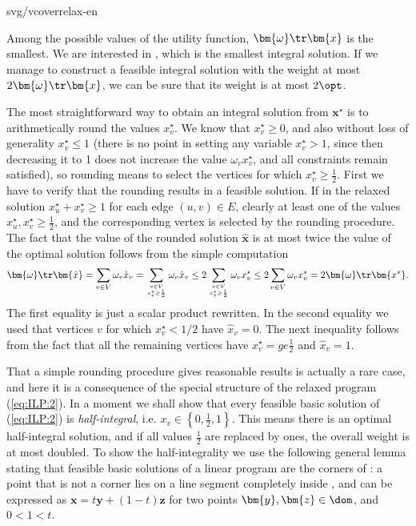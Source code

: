 \begin{myfig}{0.7\textwidth}{svg/vcoverrelax-en}
\end{myfig}

\noindent 
Among the possible values of the utility function,  $\bm{\omega}\tr\bm{x}$ is the smallest. 
We are interested in \opt, which is the smallest integral solution. If we manage to construct a
feasible integral solution with the weight at most $2\bm{\omega}\tr\bm{x}$, we can be sure that
its weight is at most $2\opt$. 


\noindent 
The most straightforward way to obtain an integral solution from $\bm{x^\star}$
is to arithmetically round the values $x_v^\star$.
We know that $x_v^\star\ge0$, and also without loss of generality $x_v^\star\le 1$ (there is no point in
setting  any variable $x_v^\star>1$, since then decreasing it to 1 does not increase the value  $\omega_vx_v^\star$,
and all constraints remain satisfied), so rounding means to select the vertices for which $x_v^\star\ge\frac{1}{2}$.
First we have to verify that the rounding results in a feasible solution. If in the relaxed solution 
$x_u^\star+x_v^\star\ge1$
for each edge $(u,v)\in E$, clearly at least one of the values $x_u^\star,x_v^\star\ge\frac{1}{2}$, 
and the corresponding vertex is selected by the
rounding procedure. The fact that the value of the rounded solution $\bm{\hat{x}}$ 
is at most twice the value of the optimal solution follows from the simple computation 
$$\bm{\omega}\tr\bm{\hat{x}}=\sum_{v\in V}\omega_v\hat{x}_v=\sum_{v\in V\atop
x_v^\star\ge\frac{1}{2}}\omega_v\hat{x}_v \le2\sum_{v\in V\atop
x_v^\star\ge\frac{1}{2}}\omega_v x_v^\star\le2\sum_{v\in
V}\omega_vx_v^\star=2\bm{\omega}\tr\bm{x^\star}.$$ 
The first equality is just a scalar product rewritten. In the second equality we used that vertices $v$ for which 
$x_v^\star<1/2$ have $\hat{x}_v=0$. The next inequality follows from the fact that all the remaining
vertices have $x_v^\star=ge\frac{1}{2}$ and $\hat{x}_v=1$.


\noindent
That a simple rounding procedure gives reasonable results is actually a rare case, and here it is a
consequence of the special structure of the relaxed program  (\ref{eq:ILP:2}). In a moment we shall 
show that every feasible basic solution of  (\ref{eq:ILP:2}) is {\em half-integral}, i.e. 
 $x_v\in\left\{0,\frac{1}{2},1\right\}$. This means there is an optimal half-integral solution,
and if all values $\frac{1}{2}$ are replaced by ones, the overall weight is at most doubled. 
To show the half-integrality we use the following general lemma stating that feasible basic solutions
of a linear program are the corners of \dom: a point  that is not a corner lies on a line segment 
completely inside \dom, and can be expressed as 
$\bm{x}=t\bm{y}+(1-t)\bm{z}$ for two points
$\bm{y}, \bm{z}\in\dom$, and $0<1<t$.

